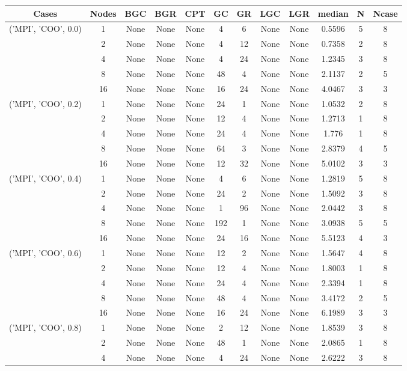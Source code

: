 \begin{tabular}{cccccccccccc}
\hline
Cases & Nodes& BGC& BGR& CPT& GC& GR& LGC& LGR& median & N & Ncase \\
\hline
\multirow{5}{*}{('MPI', 'COO', 0.0)}& 1& None& None& None& 4& 6& None& None& 0.5596& 5& 8\\
& 2& None& None& None& 4& 12& None& None& 0.7358& 2& 8\\
& 4& None& None& None& 4& 24& None& None& 1.2345& 3& 8\\
& 8& None& None& None& 48& 4& None& None& 2.1137& 2& 5\\
& 16& None& None& None& 16& 24& None& None& 4.0467& 3& 3\\
\hline
\multirow{5}{*}{('MPI', 'COO', 0.2)}& 1& None& None& None& 24& 1& None& None& 1.0532& 2& 8\\
& 2& None& None& None& 12& 4& None& None& 1.2713& 1& 8\\
& 4& None& None& None& 24& 4& None& None& 1.776& 1& 8\\
& 8& None& None& None& 64& 3& None& None& 2.8379& 4& 5\\
& 16& None& None& None& 12& 32& None& None& 5.0102& 3& 3\\
\hline
\multirow{5}{*}{('MPI', 'COO', 0.4)}& 1& None& None& None& 4& 6& None& None& 1.2819& 5& 8\\
& 2& None& None& None& 24& 2& None& None& 1.5092& 3& 8\\
& 4& None& None& None& 1& 96& None& None& 2.0442& 3& 8\\
& 8& None& None& None& 192& 1& None& None& 3.0938& 5& 5\\
& 16& None& None& None& 24& 16& None& None& 5.5123& 4& 3\\
\hline
\multirow{5}{*}{('MPI', 'COO', 0.6)}& 1& None& None& None& 12& 2& None& None& 1.5647& 4& 8\\
& 2& None& None& None& 12& 4& None& None& 1.8003& 1& 8\\
& 4& None& None& None& 24& 4& None& None& 2.3394& 1& 8\\
& 8& None& None& None& 48& 4& None& None& 3.4172& 2& 5\\
& 16& None& None& None& 16& 24& None& None& 6.1989& 3& 3\\
\hline
\multirow{5}{*}{('MPI', 'COO', 0.8)}& 1& None& None& None& 2& 12& None& None& 1.8539& 3& 8\\
& 2& None& None& None& 48& 1& None& None& 2.0865& 1& 8\\
& 4& None& None& None& 4& 24& None& None& 2.6222& 3& 8\\

\end{tabular}
